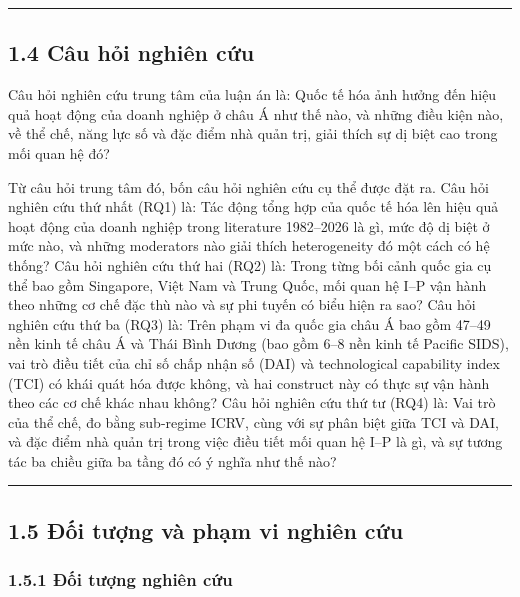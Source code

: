 \documentclass[12pt,a4paper]{article}
\begin{document}
\begin{center}\rule{0.5\linewidth}{0.5pt}\end{center}

\hypertarget{14-cuxe2u-hux1ecfi-nghiuxean-cux1ee9u}{%
\subsection{1.4 Câu hỏi nghiên
cứu}\label{14-cuxe2u-hux1ecfi-nghiuxean-cux1ee9u}}

Câu hỏi nghiên cứu trung tâm của luận án là: Quốc tế hóa ảnh hưởng đến
hiệu quả hoạt động của doanh nghiệp ở châu Á như thế nào, và những điều
kiện nào, về thể chế, năng lực số và đặc điểm nhà quản trị, giải thích
sự dị biệt cao trong mối quan hệ đó?

Từ câu hỏi trung tâm đó, bốn câu hỏi nghiên cứu cụ thể được đặt ra. Câu
hỏi nghiên cứu thứ nhất (RQ1) là: Tác động tổng hợp của quốc tế hóa lên
hiệu quả hoạt động của doanh nghiệp trong literature 1982--2026 là gì,
mức độ dị biệt ở mức nào, và những moderators nào giải thích
heterogeneity đó một cách có hệ thống? Câu hỏi nghiên cứu thứ hai (RQ2)
là: Trong từng bối cảnh quốc gia cụ thể bao gồm Singapore, Việt Nam và
Trung Quốc, mối quan hệ I--P vận hành theo những cơ chế đặc thù nào và
sự phi tuyến có biểu hiện ra sao? Câu hỏi nghiên cứu thứ ba (RQ3) là:
Trên phạm vi đa quốc gia châu Á bao gồm 47--49 nền kinh tế châu Á và
Thái Bình Dương (bao gồm 6--8 nền kinh tế Pacific SIDS), vai trò điều
tiết của chỉ số chấp nhận số (DAI) và technological capability index
(TCI) có khái quát hóa được không, và hai construct này có thực sự vận
hành theo các cơ chế khác nhau không? Câu hỏi nghiên cứu thứ tư (RQ4)
là: Vai trò của thể chế, đo bằng sub-regime ICRV, cùng với sự phân biệt
giữa TCI và DAI, và đặc điểm nhà quản trị trong việc điều tiết mối quan
hệ I--P là gì, và sự tương tác ba chiều giữa ba tầng đó có ý nghĩa như
thế nào?

\begin{center}\rule{0.5\linewidth}{0.5pt}\end{center}

\hypertarget{15-ux111ux1ed1i-tux1b0ux1ee3ng-vuxe0-phux1ea1m-vi-nghiuxean-cux1ee9u}{%
\subsection{1.5 Đối tượng và phạm vi nghiên
cứu}\label{15-ux111ux1ed1i-tux1b0ux1ee3ng-vuxe0-phux1ea1m-vi-nghiuxean-cux1ee9u}}

\hypertarget{151-ux111ux1ed1i-tux1b0ux1ee3ng-nghiuxean-cux1ee9u}{%
\subsubsection{1.5.1 Đối tượng nghiên
cứu}\label{151-ux111ux1ed1i-tux1b0ux1ee3ng-nghiuxean-cux1ee9u}}
\end{document}
